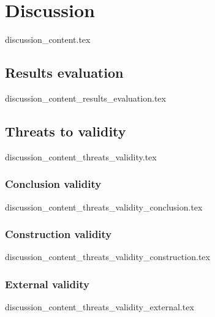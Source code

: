 \chapter{Discussion}
  {discussion_content.tex}

\section{Results evaluation}
  {discussion_content_results_evaluation.tex}

\section{Threats to validity}
  {discussion_content_threats_validity.tex}

\subsection{Conclusion validity}
  {discussion_content_threats_validity_conclusion.tex}

\subsection{Construction validity}
  {discussion_content_threats_validity_construction.tex}

\subsection{External validity}
  {discussion_content_threats_validity_external.tex}
